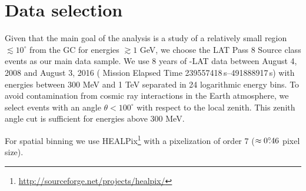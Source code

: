 \section{Data selection}

Given that the main goal of the analysis is a study of a relatively small region $\lesssim 10^\circ$ from the GC for energies $\gtrsim 1$ GeV,
we choose the \Fermi LAT Pass 8 Source class events as our main data sample.
We use 8 years of {\Fermi}-LAT data between August 4, 2008  and August 3, 2016 ({\Fermi} Mission Elapsed Time 239557418\,s--491888917\,s)
with energies between 300 MeV 
and 1 TeV separated in 24 logarithmic energy bins.
To avoid contamination from cosmic ray interactions in the Earth atmosphere, 
we select events with an angle $\theta < 100^{\circ}$ with respect to the local zenith.
This zenith angle cut is sufficient for energies above 300 MeV.

For spatial binning we use HEALPix\footnote{\url{http://sourceforge.net/projects/healpix/}} \citep{2005ApJ...622..759G} with a pixelization of order 7 
($\approx 0^\circ\!\!.46$ pixel size). 